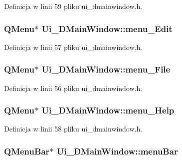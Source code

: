 Definicja w linii 59 pliku ui\-\_\-dmainwindow.\-h.

\hypertarget{class_ui___d_main_window_a8826a3e34a5aa75fca2b8e45b7010a8b}{
\subsubsection[{menu\-\_\-\-Edit}]{\setlength{\rightskip}{0pt plus 5cm}Q\-Menu$\ast$ Ui\-\_\-\-D\-Main\-Window\-::menu\-\_\-\-Edit}}\label{class_ui___d_main_window_a8826a3e34a5aa75fca2b8e45b7010a8b}


Definicja w linii 57 pliku ui\-\_\-dmainwindow.\-h.

\hypertarget{class_ui___d_main_window_a991f4d15852faf04d8c12694b3e077ad}{
\subsubsection[{menu\-\_\-\-File}]{\setlength{\rightskip}{0pt plus 5cm}Q\-Menu$\ast$ Ui\-\_\-\-D\-Main\-Window\-::menu\-\_\-\-File}}\label{class_ui___d_main_window_a991f4d15852faf04d8c12694b3e077ad}


Definicja w linii 56 pliku ui\-\_\-dmainwindow.\-h.

\hypertarget{class_ui___d_main_window_ac2997077098614d72b21d29c7a48350c}{
\subsubsection[{menu\-\_\-\-Help}]{\setlength{\rightskip}{0pt plus 5cm}Q\-Menu$\ast$ Ui\-\_\-\-D\-Main\-Window\-::menu\-\_\-\-Help}}\label{class_ui___d_main_window_ac2997077098614d72b21d29c7a48350c}


Definicja w linii 58 pliku ui\-\_\-dmainwindow.\-h.

\hypertarget{class_ui___d_main_window_a788ef749d82ca070e467e55cca0d47dd}{
\subsubsection[{menu\-Bar}]{\setlength{\rightskip}{0pt plus 5cm}Q\-Menu\-Bar$\ast$ Ui\-\_\-\-D\-Main\-Window\-::menu\-Bar}}\label{class_ui___d_main_window_a788ef749d82ca070e467e55cca0d47dd}


